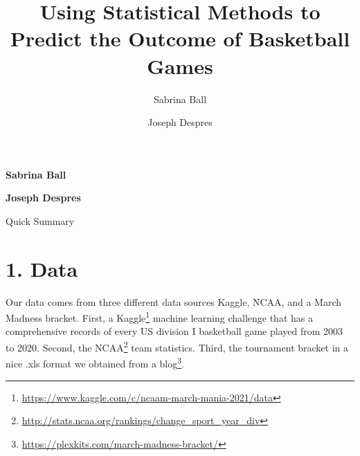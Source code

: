 \documentclass[11pt,]{article}
\title{Using Statistical Methods to Predict the Outcome of Basketball
Games  }
\author{\Large Sabrina
Ball\vspace{0.05in} \newline\normalsize\emph{}   \and \Large Joseph
Despres\vspace{0.05in} \newline\normalsize\emph{}  }
\date{}
\newcommand*{\authorfont}{\fontfamily{phv}\selectfont}
\renewenvironment{abstract}
 {{%
    \setlength{\leftmargin}{0mm}
    \setlength{\rightmargin}{\leftmargin}%
  }%
  \relax}
 {\endlist}
\begin{document}
%

{%
\setlength{\parindent}{0pt}
\thispagestyle{plain}
{\fontsize{18}{20}\selectfont\raggedright
\maketitle  %

}

{
   \vskip 13.5pt\relax \normalsize\fontsize{11}{12}
\textbf{\authorfont Sabrina
Ball} \hskip 15pt \emph{\small }   \par \textbf{\authorfont Joseph
Despres} \hskip 15pt \emph{\small }   

}

}








\begin{abstract}

    \hbox{\vrule height .2pt width 39.14pc}

    \vskip 8.5pt %

\noindent Quick Summary


    \hbox{\vrule height .2pt width 39.14pc}


\end{abstract}


\vskip -8.5pt



\noindent 

\hypertarget{data}{%
\section{1. Data}\label{data}}

Our data comes from three different data sources Kaggle, NCAA, and a
March Madness bracket. First, a Kaggle\footnote{\url{https://www.kaggle.com/c/ncaam-march-mania-2021/data}}
machine learning challenge that has a comprehensive records of every US
division I basketball game played from 2003 to 2020. Second, the
NCAA\footnote{\url{http://stats.ncaa.org/rankings/change_sport_year_div}}
team statistics. Third, the tournament bracket in a nice .xls format we
obtained from a blog\footnote{\url{https://plexkits.com/march-madness-bracket/}}.
\end{document}
